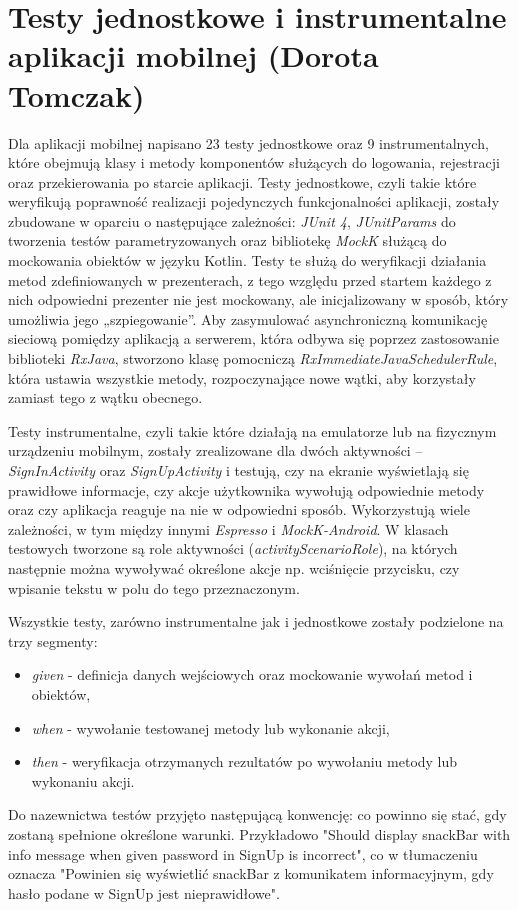 \documentclass[10pt,twoside,a4paper]{report}
\begin{document}
\section{Testy jednostkowe i instrumentalne aplikacji mobilnej (Dorota Tomczak)}
\par Dla aplikacji mobilnej napisano 23 testy jednostkowe oraz 9 instrumentalnych, które obejmują klasy i metody komponentów służących do logowania, rejestracji oraz przekierowania po starcie aplikacji. Testy jednostkowe, czyli takie które weryfikują poprawność realizacji pojedynczych funkcjonalności aplikacji, zostały zbudowane w oparciu o następujące zależności: \textit{JUnit 4}\cite{JUnit}, \textit{JUnitParams}\cite{JUnitParms} do tworzenia testów parametryzowanych oraz bibliotekę \textit{MockK}\cite{MockK} służącą do mockowania obiektów w języku Kotlin. Testy te służą do weryfikacji działania metod zdefiniowanych w prezenterach, z tego względu przed startem każdego z nich odpowiedni prezenter nie jest mockowany, ale inicjalizowany w sposób, który umożliwia jego „szpiegowanie”. Aby zasymulować asynchroniczną komunikację sieciową pomiędzy aplikacją a serwerem, która odbywa się poprzez zastosowanie biblioteki \textit{RxJava}\cite{RxJava}, stworzono klasę pomocniczą \textit{RxImmediateJavaSchedulerRule}, która ustawia wszystkie metody, rozpoczynające nowe wątki, aby korzystały zamiast tego z wątku obecnego.
\par Testy instrumentalne, czyli takie które działają na emulatorze lub na fizycznym urządzeniu mobilnym, zostały zrealizowane dla dwóch aktywności – \textit{SignInActivity} oraz \textit{SignUpActivity} i testują, czy na ekranie wyświetlają się prawidłowe informacje, czy akcje użytkownika wywołują odpowiednie metody oraz czy aplikacja reaguje na nie w odpowiedni sposób. Wykorzystują wiele zależności, w tym między innymi \textit{Espresso}\cite{Espresso} i \textit{MockK-Android}\cite{MockK-Android}. W klasach testowych tworzone są role aktywności (\textit{activityScenarioRole}), na których następnie można wywoływać określone akcje np. wciśnięcie przycisku, czy wpisanie tekstu w polu do tego przeznaczonym. 
\par Wszystkie testy, zarówno instrumentalne jak i jednostkowe zostały podzielone na trzy segmenty:
\begin{itemize}
\item \textit{given} - definicja danych wejściowych oraz mockowanie wywołań metod i obiektów,
\item \textit{when} - wywołanie testowanej metody lub wykonanie akcji,
\item \textit{then} - weryfikacja otrzymanych rezultatów po wywołaniu metody lub wykonaniu akcji.
\end{itemize}
Do nazewnictwa testów przyjęto następującą konwencję: co powinno się stać, gdy zostaną spełnione określone warunki. Przykładowo "Should display snackBar with info message when given password in SignUp is incorrect", co w tłumaczeniu oznacza "Powinien się wyświetlić snackBar z komunikatem informacyjnym, gdy hasło podane w SignUp jest nieprawidłowe".
\end{document}
